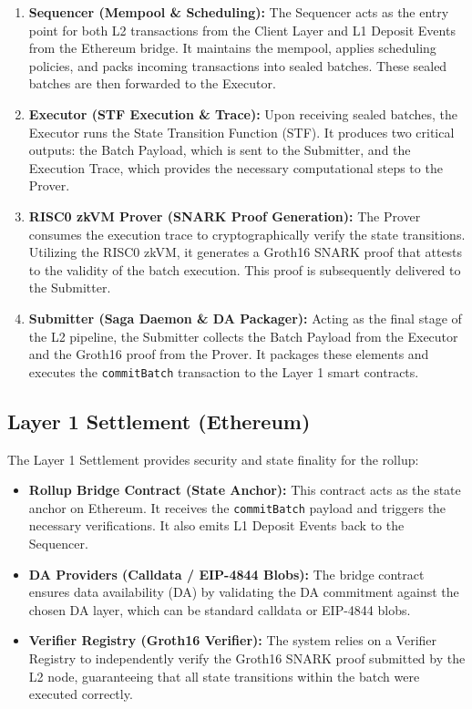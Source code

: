\begin{enumerate}
    \item \textbf{Sequencer (Mempool \& Scheduling):} The Sequencer acts as the entry point for both L2 transactions from the Client Layer and L1 Deposit Events from the Ethereum bridge. It maintains the mempool, applies scheduling policies, and packs incoming transactions into sealed batches. These sealed batches are then forwarded to the Executor.
    \item \textbf{Executor (STF Execution \& Trace):} Upon receiving sealed batches, the Executor runs the State Transition Function (STF). It produces two critical outputs: the Batch Payload, which is sent to the Submitter, and the Execution Trace, which provides the necessary computational steps to the Prover.
    \item \textbf{RISC0 zkVM Prover (SNARK Proof Generation):} The Prover consumes the execution trace to cryptographically verify the state transitions. Utilizing the RISC0 zkVM, it generates a Groth16 SNARK proof that attests to the validity of the batch execution. This proof is subsequently delivered to the Submitter.
    \item \textbf{Submitter (Saga Daemon \& DA Packager):} Acting as the final stage of the L2 pipeline, the Submitter collects the Batch Payload from the Executor and the Groth16 proof from the Prover. It packages these elements and executes the \texttt{commitBatch} transaction to the Layer 1 smart contracts.
\end{enumerate}

\subsection{Layer 1 Settlement (Ethereum)}
The Layer 1 Settlement provides security and state finality for the rollup:

\begin{itemize}
    \item \textbf{Rollup Bridge Contract (State Anchor):} This contract acts as the state anchor on Ethereum. It receives the \texttt{commitBatch} payload and triggers the necessary verifications. It also emits L1 Deposit Events back to the Sequencer.
    \item \textbf{DA Providers (Calldata / EIP-4844 Blobs):} The bridge contract ensures data availability (DA) by validating the DA commitment against the chosen DA layer, which can be standard calldata or EIP-4844 blobs.
    \item \textbf{Verifier Registry (Groth16 Verifier):} The system relies on a Verifier Registry to independently verify the Groth16 SNARK proof submitted by the L2 node, guaranteeing that all state transitions within the batch were executed correctly.
\end{itemize}
